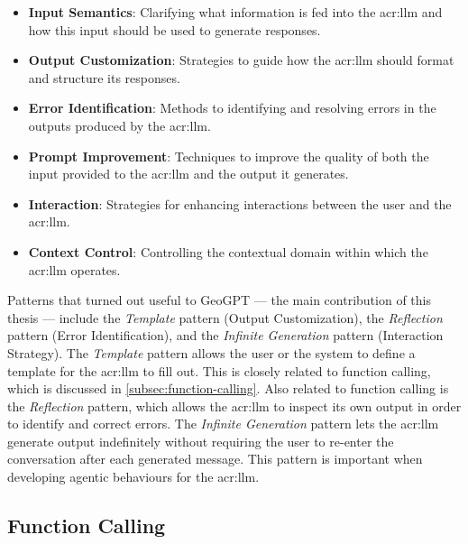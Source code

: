 \begin{itemize}
    \item \textbf{Input Semantics}: Clarifying what information is fed into the \acrshort{acr:llm} and how this input should be used to generate responses.
    \item \textbf{Output Customization}: Strategies to guide how the \acrshort{acr:llm} should format and structure its responses.
    \item \textbf{Error Identification}: Methods to identifying and resolving errors in the outputs produced by the \acrshort{acr:llm}.
    \item \textbf{Prompt Improvement}: Techniques to improve the quality of both the input provided to the \acrshort{acr:llm} and the output it generates.
    \item \textbf{Interaction}: Strategies for enhancing interactions between the user and the \acrshort{acr:llm}.
    \item \textbf{Context Control}: Controlling the contextual domain within which the \acrshort{acr:llm} operates.
\end{itemize}

Patterns that turned out useful to GeoGPT --- the main contribution of this thesis --- include the \textit{Template} pattern (Output Customization), the \textit{Reflection} pattern (Error Identification), and the \textit{Infinite Generation} pattern (Interaction Strategy). The \textit{Template} pattern allows the user or the system to define a template for the \acrshort{acr:llm} to fill out. This is closely related to function calling, which is discussed in \autoref{subsec:function-calling}. Also related to function calling is the \textit{Reflection} pattern, which allows the \acrshort{acr:llm} to inspect its own output in order to identify and correct errors. The \textit{Infinite Generation} pattern lets the \acrshort{acr:llm} generate output indefinitely without requiring the user to re-enter the conversation after each generated message. This pattern is important when developing agentic behaviours for the \acrshort{acr:llm}.


\subsection[Function Calling LLMs]{Function Calling }
\label{subsec:function-calling}

